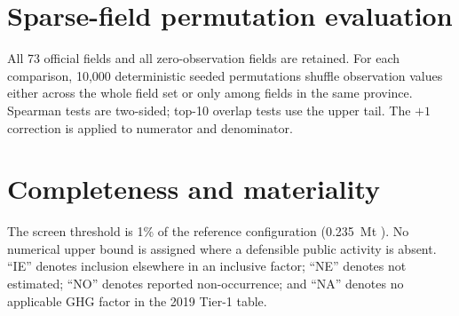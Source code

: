 \documentclass[3p,times,authoryear]{elsarticle}
\begin{document}
\section{Sparse-field permutation evaluation}

All 73 official fields and all zero-observation fields are retained. For each comparison,
10,000 deterministic seeded permutations shuffle observation values either across the whole
field set or only among fields in the same province. Spearman tests are two-sided; top-10
overlap tests use the upper tail. The $+1$ correction is applied to numerator and denominator.

\begin{table}[H]
\centering
\footnotesize
{}
\caption{Seeded permutation diagnostics. Observation quantities are not annualized emissions.}
\label{tab:s2permutation}
\end{table}

\section{Completeness and materiality}

The screen threshold is 1\% of the reference configuration
(\SI{0.235}{\mega\tonne} \COe{}). No numerical upper bound is assigned where a defensible
public activity is absent. ``IE'' denotes inclusion elsewhere in an inclusive factor; ``NE''
denotes not estimated; ``NO'' denotes reported non-occurrence; and ``NA'' denotes no applicable
GHG factor in the 2019 Tier-1 table.
\end{document}
